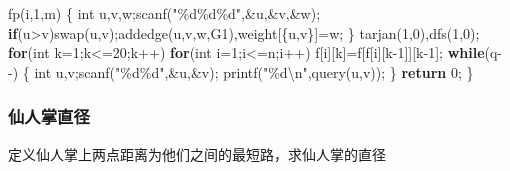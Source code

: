\documentclass[
]{article}
\newenvironment{Shaded}{}{}
\newcommand{\ControlFlowTok}[1]{\textcolor[rgb]{0.00,0.44,0.13}{\textbf{#1}}}
\newcommand{\DataTypeTok}[1]{\textcolor[rgb]{0.56,0.13,0.00}{#1}}
\newcommand{\DecValTok}[1]{\textcolor[rgb]{0.25,0.63,0.44}{#1}}
\newcommand{\NormalTok}[1]{#1}
\newcommand{\SpecialCharTok}[1]{\textcolor[rgb]{0.25,0.44,0.63}{#1}}
\newcommand{\StringTok}[1]{\textcolor[rgb]{0.25,0.44,0.63}{#1}}
\begin{document}
\begin{Shaded}
\begin{Highlighting}[]
\NormalTok{    fp(i,}\DecValTok{1}\NormalTok{,m)}
\NormalTok{    \{}
        \DataTypeTok{int}\NormalTok{ u,v,w;scanf(}\StringTok{"}\SpecialCharTok{\%d\%d\%d}\StringTok{"}\NormalTok{,\&u,\&v,\&w);}
        \ControlFlowTok{if}\NormalTok{(u\textgreater{}v)swap(u,v);addedge(u,v,w,G1),weight[\{u,v\}]=w;}
\NormalTok{    \}}
\NormalTok{    tarjan(}\DecValTok{1}\NormalTok{,}\DecValTok{0}\NormalTok{),dfs(}\DecValTok{1}\NormalTok{,}\DecValTok{0}\NormalTok{);}
    \ControlFlowTok{for}\NormalTok{(}\DataTypeTok{int}\NormalTok{ k=}\DecValTok{1}\NormalTok{;k\textless{}=}\DecValTok{20}\NormalTok{;k++)}
        \ControlFlowTok{for}\NormalTok{(}\DataTypeTok{int}\NormalTok{ i=}\DecValTok{1}\NormalTok{;i\textless{}=n;i++)}
\NormalTok{            f[i][k]=f[f[i][k{-}}\DecValTok{1}\NormalTok{]][k{-}}\DecValTok{1}\NormalTok{];}
    \ControlFlowTok{while}\NormalTok{(q{-}{-})}
\NormalTok{    \{}
        \DataTypeTok{int}\NormalTok{ u,v;scanf(}\StringTok{"}\SpecialCharTok{\%d\%d}\StringTok{"}\NormalTok{,\&u,\&v);}
\NormalTok{        printf(}\StringTok{"}\SpecialCharTok{\%d\textbackslash{}n}\StringTok{"}\NormalTok{,query(u,v));}
\NormalTok{    \}}
    \ControlFlowTok{return} \DecValTok{0}\NormalTok{;}
\NormalTok{\}}
\end{Highlighting}
\end{Shaded}

\hypertarget{ux4ed9ux4ebaux638cux76f4ux5f84}{%
\subsubsection{仙人掌直径}\label{ux4ed9ux4ebaux638cux76f4ux5f84}}

定义仙人掌上两点距离为他们之间的最短路，求仙人掌的直径
\end{document}
